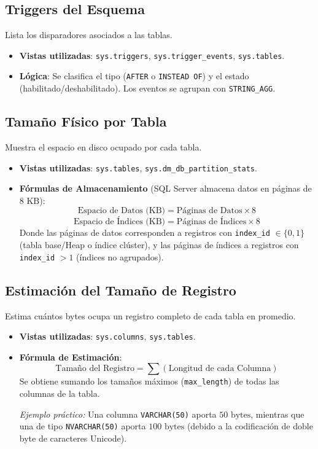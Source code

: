 \documentclass[11pt,a4paper]{article}
\begin{document}
\subsection{Triggers del Esquema}
Lista los disparadores asociados a las tablas.
\begin{itemize}
    \item \textbf{Vistas utilizadas}: \texttt{sys.triggers}, \texttt{sys.trigger\_events}, \texttt{sys.tables}.
    \item \textbf{Lógica}: Se clasifica el tipo (\texttt{AFTER} o \texttt{INSTEAD OF}) y el estado (habilitado/deshabilitado). Los eventos se agrupan con \texttt{STRING\_AGG}.
\end{itemize}

\subsection{Tamaño Físico por Tabla}
Muestra el espacio en disco ocupado por cada tabla.
\begin{itemize}
    \item \textbf{Vistas utilizadas}: \texttt{sys.tables}, \texttt{sys.dm\_db\_partition\_stats}.
    \item \textbf{Fórmulas de Almacenamiento} (SQL Server almacena datos en páginas de $8\text{ KB}$):
        \begin{equation}
            \text{Espacio de Datos (KB)} = \text{Páginas de Datos} \times 8
        \end{equation}
        \begin{equation}
            \text{Espacio de Índices (KB)} = \text{Páginas de Índices} \times 8
        \end{equation}
        Donde las páginas de datos corresponden a registros con \texttt{index\_id} $\in \{0,1\}$ (tabla base/Heap o índice clúster), y las páginas de índices a registros con \texttt{index\_id} $> 1$ (índices no agrupados).
\end{itemize}

\subsection{Estimación del Tamaño de Registro}
Estima cuántos bytes ocupa un registro completo de cada tabla en promedio.
\begin{itemize}
    \item \textbf{Vistas utilizadas}: \texttt{sys.columns}, \texttt{sys.tables}.
    \item \textbf{Fórmula de Estimación}:
        \begin{equation}
            \text{Tamaño del Registro} = \sum \left( \text{Longitud de cada Columna} \right)
        \end{equation}
        Se obtiene sumando los tamaños máximos (\texttt{max\_length}) de todas las columnas de la tabla.
        
        \textit{Ejemplo práctico:} Una columna \texttt{VARCHAR(50)} aporta $50\text{ bytes}$, mientras que una de tipo \texttt{NVARCHAR(50)} aporta $100\text{ bytes}$ (debido a la codificación de doble byte de caracteres Unicode).
\end{itemize}
\end{document}
